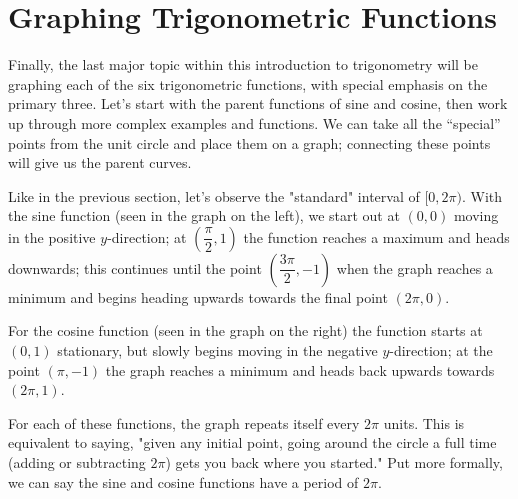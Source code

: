 \documentclass[../book.tex]{subfiles}
\begin{document}
\section{Graphing Trigonometric Functions}
\noindent Finally, the last major topic within this introduction to trigonometry will be graphing each of the six trigonometric functions, with special emphasis on the primary three. Let's start with the parent functions of sine and cosine, then work up through more complex examples and functions. We can take all the “special” points from the unit circle and place them on a graph; connecting these points will give us the parent curves.
\begin{figure}[!ht]
    \centering
\end{figure}

Like in the previous section, let's observe the "standard" interval of $[0,2\pi)$. With the sine function (seen in the graph on the left), we start out at $(0,0)$ moving in the positive $y$-direction; at $\left(\dfrac{\pi}{2},1\right)$ the function reaches a maximum and heads downwards; this continues until the point $\left(\dfrac{3\pi}{2},-1\right)$ when the graph reaches a minimum and begins heading upwards towards the final point $(2\pi,0)$.

For the cosine function (seen in the graph on the right) the function starts at $(0,1)$ stationary, but slowly begins moving in the negative $y$-direction; at the point $(\pi,-1)$ the graph reaches a minimum and heads back upwards towards $(2\pi,1)$.

For each of these functions, the graph repeats itself every $2\pi$ units. This is equivalent to saying, "given any initial point, going around the circle a full time (adding or subtracting $2\pi$) gets you back where you started." Put more formally, we can say the sine and cosine functions have a period of $2\pi$.
\end{document}
